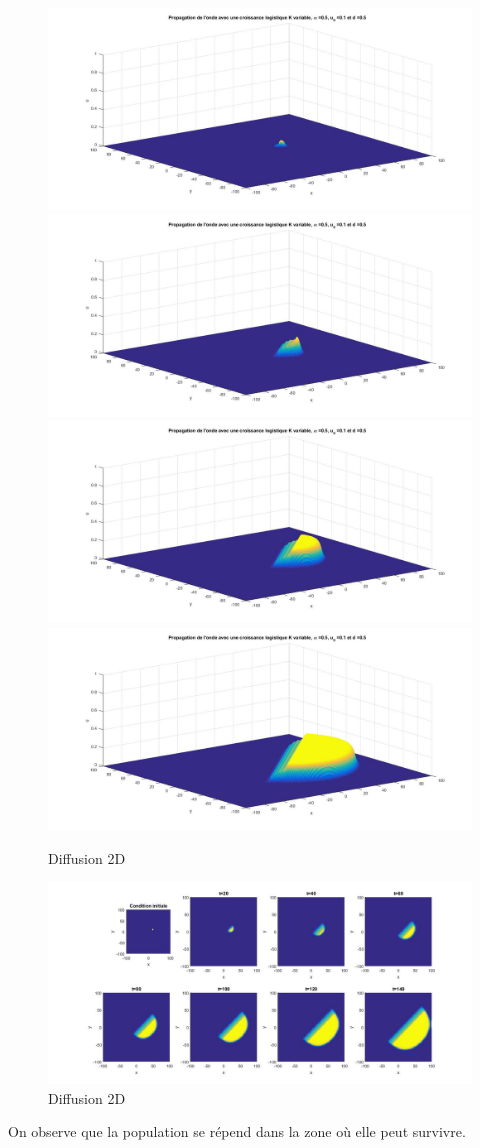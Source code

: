 \documentclass[a4paper,11pt]{article}
\begin{document}
\begin{figure}[H]
	\centering
	\includegraphics[width=0.5\linewidth]{SimulationKPP/Enviro/poleNord1}\hfill
	\includegraphics[width=0.5\linewidth]{SimulationKPP/Enviro/poleNord3}\hfill
	\includegraphics[width=0.5\linewidth]{SimulationKPP/Enviro/poleNord5}\hfill
	\includegraphics[width=0.5\linewidth]{SimulationKPP/Enviro/poleNord8}
	\caption{Diffusion 2D}
\end{figure}
\begin{figure}[H]
	\centering
	\includegraphics[width=0.7\linewidth]{SimulationKPP/Enviro/PolenordVueHaut}
	\caption{Diffusion 2D}
\end{figure}

On observe que la population se répend dans la zone où elle peut survivre.
\end{document}
